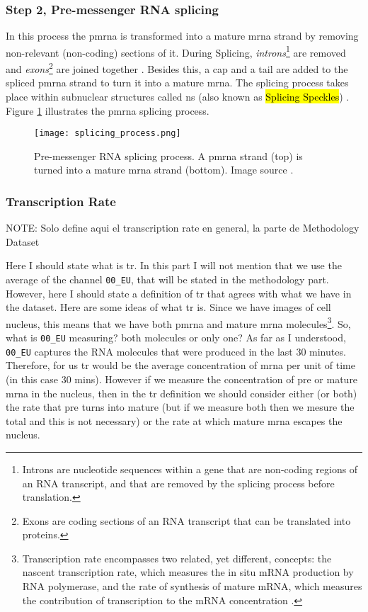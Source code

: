 \subsubsection{Step 2, Pre-messenger RNA splicing}
In this process the \gls{pmrna} is transformed into a mature \gls{mrna} strand by removing non-relevant (non-coding) sections of it.
During Splicing, \textit{introns}\footnote{Introns are nucleotide sequences within a gene that are non-coding regions of an RNA transcript, and that are removed by the splicing process before translation.} are removed and \textit{exons}\footnote{Exons are coding sections of an RNA transcript that can be translated into proteins.} are joined together \cite{Biochemistry}. Besides this, a cap and a tail are added to the spliced \gls{pmrna} strand to turn it into a mature \gls{mrna}. The splicing process takes place within subnuclear structures called \gls{ns} (also known as \hl{Splicing Speckles}) \cite{spector2011nuclear}.
Figure \ref{fig:BB:splicing} illustrates the \gls{pmrna} splicing process.

\begin{figure}[htb]
  \centering
  \texttt{[image: splicing\_process.png]}
  \caption{Pre-messenger RNA splicing process. A \gls{pmrna} strand (top) is turned into a mature \gls{mrna} strand (bottom). Image source \cite{wiki:Primary_transcript}.}
  \label{fig:BB:splicing}
\end{figure}

\subsubsection{Transcription Rate}

NOTE: Solo define aqui el transcription rate en general, la parte de Methodology Dataset

Here I should state what is \gls{tr}. In this part I will not mention that we use the average of the channel \texttt{00\_EU}, that will be stated in the methodology part. However, here I should state a definition of \gls{tr} that agrees with what we have in the dataset. Here are some ideas of what \gls{tr} is.
Since we have images of cell nucleus, this means that we have both \gls{pmrna} and mature \gls{mrna} molecules\footnote{Transcription rate encompasses two related, yet different, concepts: the nascent transcription rate, which measures the in situ mRNA production by RNA polymerase, and the rate of synthesis of mature mRNA, which measures the contribution of transcription to the mRNA concentration \cite{what_is_tr}.}. So, what is \texttt{00\_EU} measuring? both molecules or only one?
As far as I understood, \texttt{00\_EU} captures the RNA molecules that were produced in the last 30 minutes. Therefore, for us \gls{tr} would be the average concentration of \gls{mrna} per unit of time (in this case 30 mins). However if we measure the concentration of pre or mature \gls{mrna} in the nucleus, then in the \gls{tr} definition we should consider either (or both) the rate that pre turns into mature (but if we measure both then we mesure the total and this is not necessary) or the rate at which mature \gls{mrna} escapes the nucleus.

